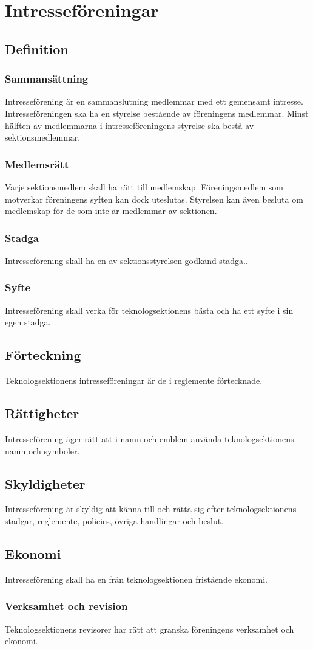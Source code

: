 \section{Intresseföreningar}

\subsection{Definition}

\subsubsection{Sammansättning}
Intresseförening är en sammanslutning medlemmar med ett gemensamt intresse. Intresseföreningen ska ha en styrelse bestående av föreningens medlemmar. Minst hälften av medlemmarna i intresseföreningens styrelse ska bestå av sektionsmedlemmar.

\subsubsection{Medlemsrätt}
Varje sektionsmedlem skall ha rätt till medlemskap. Föreningsmedlem som motverkar föreningens syften kan dock uteslutas. Styrelsen kan även besluta om medlemskap för de som inte är medlemmar av sektionen.

\subsubsection{Stadga}
Intresseförening skall ha en av sektionsstyrelsen godkänd stadga..

\subsubsection{Syfte}
Intresseförening skall verka för teknologsektionens bästa och ha ett syfte i sin egen stadga.

\subsection{Förteckning}
Teknologsektionens intresseföreningar är de i reglemente förtecknade.

\subsection{Rättigheter}
Intresseförening äger rätt att i namn och emblem använda teknologsektionens namn och symboler.

\subsection{Skyldigheter}
Intresseförening är skyldig att känna till och rätta sig efter teknologsektionens stadgar, reglemente, policies, övriga handlingar och beslut.

\subsection{Ekonomi}
Intresseförening skall ha en från teknologsektionen fristående ekonomi.

\subsubsection{Verksamhet och revision}
Teknologsektionens revisorer har rätt att granska föreningens verksamhet och ekonomi.